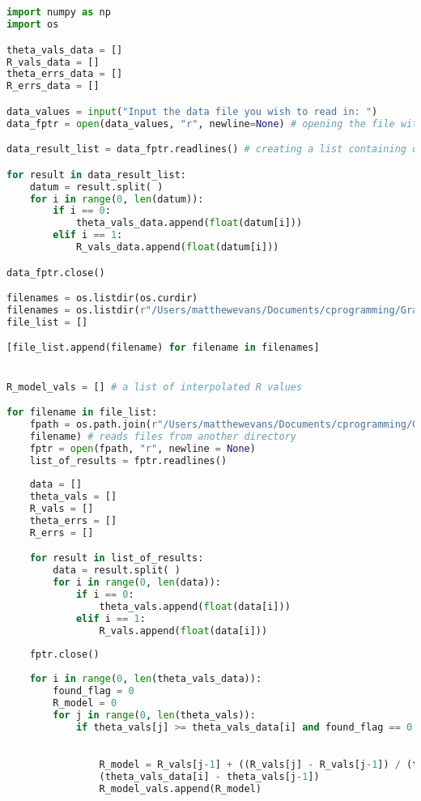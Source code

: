 \documentclass{article}
\begin{document}
\begin{footnotesize}
\begin{lstlisting}[language=Python,showstringspaces=false]


import numpy as np
import os

theta_vals_data = []
R_vals_data = []
theta_errs_data = []
R_errs_data = []

data_values = input("Input the data file you wish to read in: ")
data_fptr = open(data_values, "r", newline=None) # opening the file with the observed data 

data_result_list = data_fptr.readlines() # creating a list containing observed data results

for result in data_result_list:
    datum = result.split( )
    for i in range(0, len(datum)):
        if i == 0:
            theta_vals_data.append(float(datum[i]))
        elif i == 1:
            R_vals_data.append(float(datum[i]))

data_fptr.close()

filenames = os.listdir(os.curdir)
filenames = os.listdir(r"/Users/matthewevans/Documents/cprogramming/Graphs/PHY3138/PHY3147/phi0_0.505_late")
file_list = []

[file_list.append(filename) for filename in filenames]


R_model_vals = [] # a list of interpolated R values

for filename in file_list:
    fpath = os.path.join(r"/Users/matthewevans/Documents/cprogramming/Graphs/PHY3138/PHY3147/phi0_0.505_late", \
    filename) # reads files from another directory
    fptr = open(fpath, "r", newline = None)
    list_of_results = fptr.readlines()
 
    data = []
    theta_vals = []
    R_vals = []
    theta_errs = []
    R_errs = [] 

    for result in list_of_results:
        data = result.split( )
        for i in range(0, len(data)):
            if i == 0:
                theta_vals.append(float(data[i]))
            elif i == 1:
                R_vals.append(float(data[i]))
        
    fptr.close()
      
    for i in range(0, len(theta_vals_data)):
        found_flag = 0
        R_model = 0
        for j in range(0, len(theta_vals)):
            if theta_vals[j] >= theta_vals_data[i] and found_flag == 0:
              

                R_model = R_vals[j-1] + ((R_vals[j] - R_vals[j-1]) / (theta_vals[j] - theta_vals[j-1])) * \
                (theta_vals_data[i] - theta_vals[j-1])
                R_model_vals.append(R_model)
               

\end{lstlisting}
\end{footnotesize}
\end{document}
